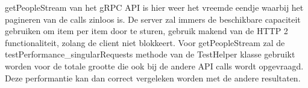 getPeopleStream van het gRPC API is hier weer het vreemde eendje waarbij het pagineren van de calls zinloos is. De server zal immers de beschikbare capaciteit gebruiken
om item per item door te sturen, gebruik makend van de HTTP 2 functionaliteit, zolang de client niet blokkeert. Voor getPeopleStream zal de testPerformance\_singularRequests methode van
de TestHelper klasse gebruikt worden voor de totale grootte die ook bij de andere API calls wordt opgevraagd. Deze performantie kan dan correct vergeleken worden met de andere resultaten.




